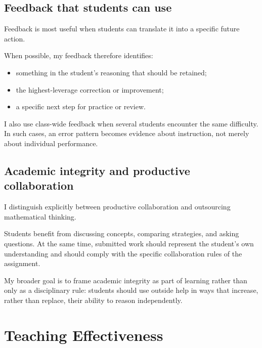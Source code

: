 \documentclass[11pt]{article}
\begin{document}
\subsection{Feedback that students can use}

Feedback is most useful when students can translate it into a
specific future action.

When possible,
my feedback therefore identifies:

\begin{itemize}

    \item something in the student's reasoning that should be
    retained;

    \item the highest-leverage correction or improvement;

    \item a specific next step for practice or review.

\end{itemize}

I also use class-wide feedback when several students encounter
the same difficulty.
In such cases,
an error pattern becomes evidence about instruction,
not merely about individual performance.

\subsection{Academic integrity and productive collaboration}

I distinguish explicitly between productive collaboration and
outsourcing mathematical thinking.

Students benefit from discussing concepts,
comparing strategies,
and asking questions.
At the same time,
submitted work should represent the student's own
understanding and should comply with the specific collaboration
rules of the assignment.

My broader goal is to frame academic integrity as part of
learning rather than only as a disciplinary rule:
students should use outside help in ways that increase,
rather than replace,
their ability to reason independently.


\newpage

\section{Teaching Effectiveness}
\end{document}
